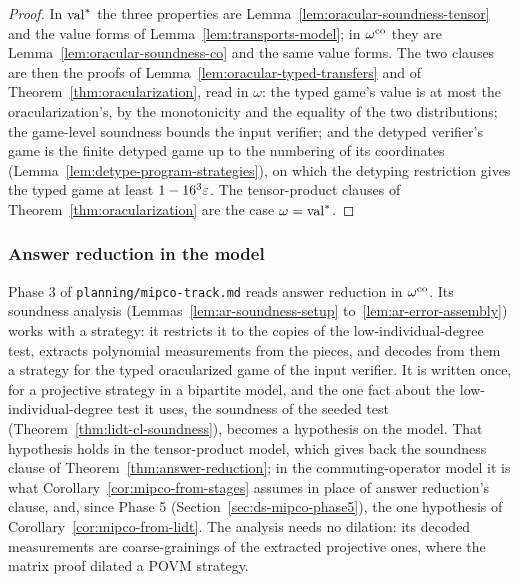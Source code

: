 \begin{proof}
\leanok
In $\mathrm{val}^*$ the three properties are Lemma~\ref{lem:oracular-soundness-tensor} and the value
forms of Lemma~\ref{lem:transports-model}; in $\omega^{\mathrm{co}}$ they are
Lemma~\ref{lem:oracular-soundness-co} and the same value forms. The two clauses are then the
proofs of Lemma~\ref{lem:oracular-typed-transfers} and of Theorem~\ref{thm:oracularization}, read
in $\omega$: the typed game's value is at most the oracularization's, by the monotonicity and the
equality of the two distributions; the game-level soundness bounds the input verifier; and the
detyped verifier's game is the finite detyped game up to the numbering of its coordinates
(Lemma~\ref{lem:detype-program-strategies}), on which the detyping restriction gives the typed
game at least $1 - 16^3\varepsilon$. The tensor-product clauses of Theorem~\ref{thm:oracularization}
are the case $\omega = \mathrm{val}^*$.
\end{proof}

\subsubsection{Answer reduction in the model}
\label{sec:ds-mipco-phase3}

Phase 3 of \texttt{planning/mipco-track.md} reads answer reduction in $\omega^{\mathrm{co}}$. Its soundness
analysis (Lemmas~\ref{lem:ar-soundness-setup} to~\ref{lem:ar-error-assembly}) works with a strategy:
it restricts it to the copies of the low-individual-degree test, extracts polynomial measurements
from the pieces, and decodes from them a strategy for the typed oracularized game of the input
verifier. It is written once, for a projective strategy in a bipartite model, and the one fact about
the low-individual-degree test it uses, the soundness of the seeded test
(Theorem~\ref{thm:lidt-cl-soundness}), becomes a hypothesis on the model. That hypothesis holds in
the tensor-product model, which gives back the soundness clause of
Theorem~\ref{thm:answer-reduction}; in the commuting-operator model it is what
Corollary~\ref{cor:mipco-from-stages} assumes in place of answer reduction's clause, and, since
Phase 5 (Section~\ref{sec:ds-mipco-phase5}), the one hypothesis of
Corollary~\ref{cor:mipco-from-lidt}. The analysis needs no dilation: its decoded measurements are
coarse-grainings of the extracted projective ones, where the matrix proof dilated a POVM strategy.


